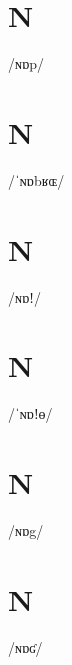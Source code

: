 \documentclass[10pt,a4paper,twoside]{book}
\begin{document}
\section*{N}

\begin{multicols}{3}
 {/ɴɒp/} {}
\end{multicols}

\section*{N}

\begin{multicols}{3}
 {/ˈɴɒbʁɶ/} {}
\end{multicols}

\section*{N}

\begin{multicols}{3}
 {/ɴɒǃ/} {}
\end{multicols}

\section*{N}

\begin{multicols}{3}
 {/ˈɴɒǃɵ/} {}
\end{multicols}

\section*{N}

\begin{multicols}{3}
 {/ɴɒg/} {}
\end{multicols}

\section*{N}

\begin{multicols}{3}
 {/ɴɒʛ/} {}
\end{multicols}
\end{document}
